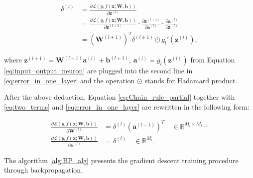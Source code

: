\documentclass[
	parskip, 			   %
	twoside, 			   %
	DIV=14, 			   %
	BCOR=15.0mm, 		   %
	headsepline, 		   %
	open=right, 		   %
	captions=tableheading, %
	bibliography=totoc,    %
	numbers=noenddot       %
]{scrreprt}
\begin{document}
\begin{equation}
    \label{eq:error_in_one_layer}
    \begin{aligned}
        \delta^{(l)} &= \frac{\partial \mathcal{L}\left( y,f(\mathbf{x};\mathbf{\mathbf{W},\mathbf{b}}) \right)}{\partial \mathbf{z}^{(l)}}
        \\
        &= \frac{\partial \mathcal{L}\left( y,f(\mathbf{x};\mathbf{\mathbf{W},\mathbf{b}}) \right)}{\partial \mathbf{z}^{(l+1)}} \cdot \frac{\partial \mathbf{z}^{(l+1)}}{\partial \mathbf{a}^{(l)}} \cdot \frac{\partial \mathbf{a}^{(l)}}{\partial \mathbf{z}^{(l)}}
        \\
        &= (\mathbf{W}^{(l+1)})^T \delta^{(l+1)} \odot g_{l}'(\mathbf{z}^{(l)}),
    \end{aligned}
\end{equation}

where $\mathbf{z}^{(l+1)} = \mathbf{W}^{(l+1)} \mathbf{a}^{(l)} + \mathbf{b}^{(l+1)}$, $\mathbf{a}^{(l)} = g_{l}(\mathbf{z}^{(l)})$ from Equation \ref{eq:input_output_neuron} are plugged into the second line in \ref{eq:error_in_one_layer} and the operation $\odot$ stands for Hadamard product.

After the above deduction, Equation \ref{eq:Chain_rule_partial} together with \ref{eq:two_terms} and \ref{eq:error_in_one_layer} are rewritten in the following form:

\begin{equation}
    \label{eq:Chain_rule_partial_deducted}
    \begin{aligned}
        \frac{\partial \mathcal{L}\left( y,f(\mathbf{x};\mathbf{\mathbf{W},\mathbf{b}}) \right)}{\partial \mathbf{W}^{(l)}} &= \delta^{(l)} (\mathbf{a}^{(l-1)})^T \quad \in \mathbb{R}^{M_{l} \times M_{l-1}}
        \\
        \frac{\partial \mathcal{L}\left( y,f(\mathbf{x};\mathbf{\mathbf{W},\mathbf{b}}) \right)}{\partial \mathbf{b}^{(l)}} &= \delta^{(l)} \quad \in \mathbb{R}^{M_{l}}.
    \end{aligned}
\end{equation}

The algorithm \ref{alg:BP_alg} presents the gradient descent training procedure through backpropagation.
\end{document}
